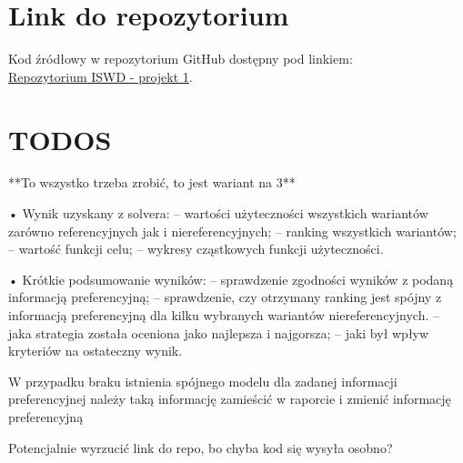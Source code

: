 \documentclass[11pt]{article}
\begin{document}
\section{Link do repozytorium}\label{sec:link-do-repo}
Kod źródłowy w repozytorium GitHub dostępny pod linkiem: \\
\href{https://github.com/KotZPolibudy/PUT_ISWD/tree/main/projekt1}{Repozytorium ISWD - projekt 1}.


\section{TODOS}\label{sec:todos}

**To wszystko trzeba zrobić, to jest wariant na 3**

• Wynik uzyskany z solvera:
– wartości użyteczności wszystkich wariantów zarówno referencyjnych jak i niereferencyjnych;
– ranking wszystkich wariantów;
– wartość funkcji celu;
– wykresy cząstkowych funkcji użyteczności.

• Krótkie podsumowanie wyników:
– sprawdzenie zgodności wyników z podaną informacją preferencyjną;
– sprawdzenie, czy otrzymany ranking jest spójny z informacją preferencyjną dla kilku wybranych wariantów niereferencyjnych.
– jaka strategia została oceniona jako najlepsza i najgorsza;
– jaki był wpływ kryteriów na ostateczny wynik.

W przypadku braku istnienia spójnego modelu dla zadanej informacji preferencyjnej należy taką
informację zamieścić w raporcie i zmienić informację preferencyjną

Potencjalnie wyrzucić link do repo, bo chyba kod się wysyła osobno?
\end{document}
